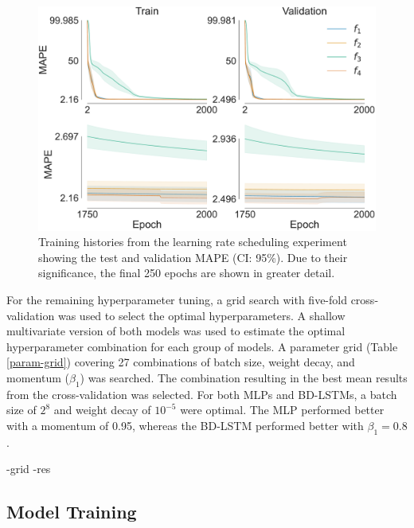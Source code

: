 \documentclass[mstat,12pt]{unswthesis}
\begin{document}
\begin{figure}[H]
\centerline{\includegraphics[width=\columnwidth]{Figures/Plots/LR scheduling experiment training histories.pdf}}
\caption{Training histories from the learning rate scheduling experiment showing the test and validation MAPE (CI: 95\%). Due to their significance, the final 250 epochs are shown in greater detail.}
\label{lr_hist}
\end{figure}

For the remaining hyperparameter tuning, a grid search with five-fold cross-validation was used to select the optimal hyperparameters. A shallow multivariate version of both models was used to estimate the optimal hyperparameter combination for each group of models. A parameter grid (Table \ref{param-grid}) covering 27 combinations of batch size, weight decay, and momentum ($\beta_1$) was searched. The combination resulting in the best mean results from the cross-validation was selected. For both MLPs and BD-LSTMs, a batch size of $2^8$ and weight decay of $10^{-5}$ were optimal. The MLP performed better with a momentum of 0.95, whereas the BD-LSTM performed better with $\beta_1=0.8$.

 \param-grid
 \gsearch-res

\hypertarget{model-training}{%
\subsection{Model Training}\label{model-training}}
\end{document}
